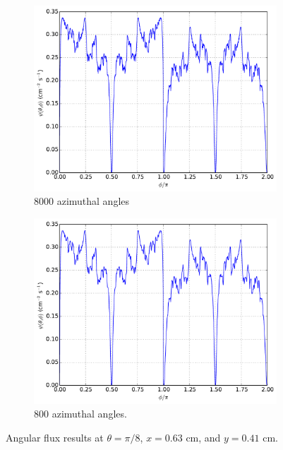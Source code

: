\documentclass[12pt]{article}
\newenvironment{solution}[1][Solution]{\begin{trivlist}
\item[\hskip \labelsep {\bfseries #1} {\hspace{-0.2em}\bfseries:}]\hspace{0.3in}\newline}{\end{trivlist}}
\begin{document}
\begin{solution}
\begin{figure}
    \begin{subfigure}{0.5\textwidth}
\centering
\includegraphics[width=1.0\textwidth]{r4163pi8.pdf}
\caption{8000 azimuthal angles}
    \end{subfigure}
    \begin{subfigure}{0.5\textwidth}
\centering
\includegraphics[width=1.0\textwidth]{800.pdf}
\caption{800 azimuthal angles.}
    \end{subfigure}
    \caption{\label{8000}Angular flux results at $\theta=\pi/8$, $x=0.63$ cm, and $y=0.41$ cm.}
\end{figure}

\clearpage


\end{solution}
\end{document}
